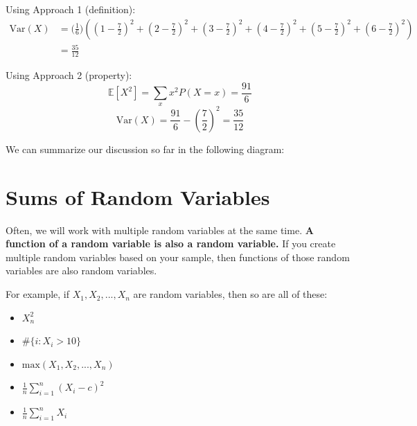 \documentclass[
  letterpaper,
  DIV=11,
  numbers=noendperiod]{scrreprt}
\providecommand{\tightlist}{%
  \setlength{\itemsep}{0pt}\setlength{\parskip}{0pt}}\usepackage{longtable,booktabs,array}
\begin{document}
\begin{tcolorbox}[enhanced jigsaw, colback=white, arc=.35mm, toprule=.15mm, colframe=quarto-callout-caution-color-frame, coltitle=black, opacitybacktitle=0.6, breakable, titlerule=0mm, leftrule=.75mm, left=2mm, opacityback=0, bottomtitle=1mm, rightrule=.15mm, colbacktitle=quarto-callout-caution-color!10!white, bottomrule=.15mm, title=\textcolor{quarto-callout-caution-color}{\faFire}\hspace{0.5em}{What's the variance, \(\text{Var}(X)?\)}, toptitle=1mm]

Using Approach 1 (definition): \[\begin{align} 
      \text{Var}(X) &= \big(\frac{1}{6}\big)((1 - \frac{7}{2})^2 + (2 - \frac{7}{2})^2 + (3 - \frac{7}{2})^2 + (4 - \frac{7}{2})^2 + (5 - \frac{7}{2})^2 + (6 - \frac{7}{2})^2) \\
      &= \frac{35}{12}
   \end{align}\]

Using Approach 2 (property):
\[\mathbb{E}[X^2] = \sum_{x} x^2 P(X = x) = \frac{91}{6}\]
\[\text{Var}(X) = \frac{91}{6} - (\frac{7}{2})^2 = \frac{35}{12}\]

\end{tcolorbox}

We can summarize our discussion so far in the following diagram:

\section{Sums of Random Variables}\label{sums-of-random-variables}

Often, we will work with multiple random variables at the same time.
\textbf{A function of a random variable is also a random variable.} If
you create multiple random variables based on your sample, then
functions of those random variables are also random variables.

For example, if \(X_1, X_2, ..., X_n\) are random variables, then so are
all of these:

\begin{itemize}
\tightlist
\item
  \(X_n^2\)
\item
  \(\#\{i : X_i > 10\}\)
\item
  \(\text{max}(X_1, X_2, ..., X_n)\)
\item
  \(\frac{1}{n} \sum_{i=1}^n (X_i - c)^2\)
\item
  \(\frac{1}{n} \sum_{i=1}^n X_i\)
\end{itemize}
\end{document}
